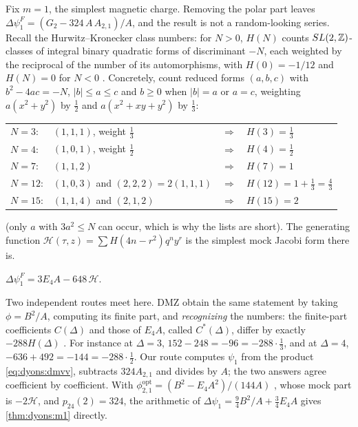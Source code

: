 Fix $m=1$, the simplest magnetic charge. Removing the polar part leaves
$\Delta\psi^F_1=(G_2-324\,A\,A_{2,1})/A$, and the result is not a random-looking series. Recall
the Hurwitz--Kronecker class numbers: for $N>0$, $H(N)$
counts $SL(2,\mathbb{Z})$-classes of integral binary quadratic forms of discriminant $-N$, each weighted by
the reciprocal of the number of its automorphisms, with $H(0)=-1/12$ and $H(N)=0$ for $N<0$
. Concretely, count reduced forms $(a,b,c)$ with
$b^2-4ac=-N$, $|b|\le a\le c$ and $b\ge0$ when $|b|=a$ or $a=c$, weighting $a(x^2+y^2)$ by
$\tfrac12$ and $a(x^2+xy+y^2)$ by $\tfrac13$:
\begin{center}
\begin{tabular}{llll}
$N=3$: & $(1,1,1)$, weight $\tfrac13$ & $\Rightarrow$ & $H(3)=\tfrac13$\\
$N=4$: & $(1,0,1)$, weight $\tfrac12$ & $\Rightarrow$ & $H(4)=\tfrac12$\\
$N=7$: & $(1,1,2)$ & $\Rightarrow$ & $H(7)=1$\\
$N=12$: & $(1,0,3)$ and $(2,2,2)=2(1,1,1)$ & $\Rightarrow$ & $H(12)=1+\tfrac13=\tfrac43$\\
$N=15$: & $(1,1,4)$ and $(2,1,2)$ & $\Rightarrow$ & $H(15)=2$
\end{tabular}
\end{center}
(only $a$ with $3a^2\le N$ can occur, which is why the lists are short). The generating
function $\mathcal H(\tau,z)=\sum H(4n-r^2)q^ny^r$  is the
simplest mock Jacobi form there is.

\begin{theorem}[Immortal dyons at $m=1$; \TA\ through $q^3$, \TL\ for the interpretation]
\label{thm:dyons:m1}
$\displaystyle \Delta\psi^F_1=3E_4A-648\,\mathcal H$.
\end{theorem}

Two independent routes meet here. DMZ obtain the same statement by taking
$\phi=B^2/A$, computing its finite part, and \emph{recognizing} the numbers: the finite-part
coefficients $C(\Delta)$ and those of $E_4A$, called $C^*(\Delta)$, differ by exactly
$-288H(\Delta)$ . For instance at $\Delta=3$,
$152-248=-96=-288\cdot\tfrac13$, and at $\Delta=4$, $-636+492=-144=-288\cdot\tfrac12$. Our
route computes $\psi_1$ from the product \eqref{eq:dyons:dmvv}, subtracts $324A_{2,1}$ and
divides by $A$; the two answers agree coefficient by coefficient. With
$\phi^{\mathrm{opt}}_{2,1}=(B^2-E_4A^2)/(144A)$ , whose mock
part is $-2\mathcal H$, and $p_{24}(2)=324$, the arithmetic of
$\Delta\psi_1=\tfrac94 B^2/A+\tfrac34E_4A$ gives \cref{thm:dyons:m1} directly.

